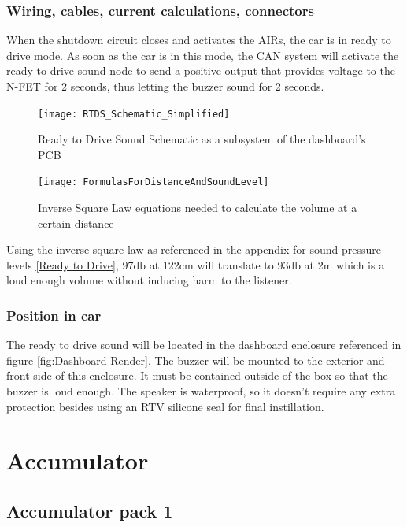 \documentclass{article}
\begin{document}
\subsubsection{Wiring, cables, current calculations, connectors}
When the shutdown circuit closes and activates the AIRs, the car is in ready to drive mode. As soon as the
car is in this mode, the CAN system will activate the ready to drive sound node to send a positive output
that provides voltage to the N-FET for 2 seconds, thus letting the buzzer sound for 2 seconds. 


\begin{figure}[h]
	\texttt{[image: RTDS\_Schematic\_Simplified]}
	\caption{Ready to Drive Sound Schematic as a subsystem of the dashboard's PCB}
\end{figure}
\begin{figure}[H]
	\texttt{[image: FormulasForDistanceAndSoundLevel]}
	\caption{Inverse Square Law equations needed to calculate the volume at a certain distance}
\end{figure}
Using the inverse square law as referenced in the appendix  for sound pressure levels \ref{Ready to Drive}, 97db at 122cm will translate to 93db at 2m which is a loud enough volume without inducing harm to the listener. 
\subsubsection{Position in car}
The ready to drive sound will be located in the dashboard enclosure referenced in figure \ref{fig:Dashboard Render}. The buzzer will be mounted
to the exterior and front side of this enclosure. It must be contained outside of the box so that the buzzer is
loud enough. The speaker is waterproof, so it doesn't require any extra protection besides using an RTV silicone seal for final instillation. 







\section{Accumulator}\label{accumulator}
\subsection{Accumulator pack 1}\label{accumulator_pack_1}
\end{document}
